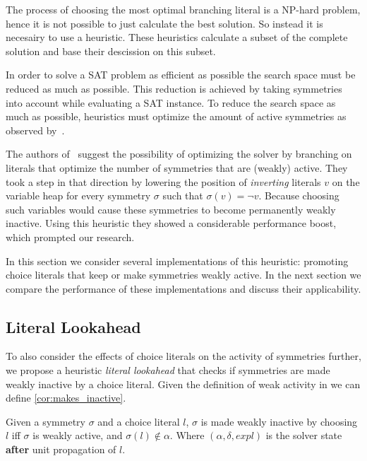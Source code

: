 
The process of choosing the most optimal branching literal is a NP-hard problem, hence it is not possible to 
just calculate the best solution. So instead it is necesairy to use a heuristic.
These heuristics calculate a subset of the complete solution and base their descission on this subset.

In order to solve a SAT problem as efficient as possible the search space must be reduced as much as possible.
This reduction is achieved by taking symmetries into account while evaluating a SAT instance.
To reduce the search space as much as possible, heuristics must optimize the amount of active symmetries as observed by~\cite{devriendt2012symmetry}.

The authors of~\cite{devriendt2012symmetry} suggest the possibility of optimizing the solver by
branching on literals that optimize the number of symmetries that are (weakly) active.
They took a step in that direction by lowering the position of \emph{inverting} literals $v$ on the variable heap for
every symmetry $\sigma$ such that $\sigma(v) = \neg v$.
Because choosing such variables would cause these symmetries to become permanently weakly inactive.
Using this heuristic they showed a considerable performance boost, which prompted our research.

In this section we consider several implementations of this heuristic: promoting choice literals
that keep or make symmetries weakly active.
In the next section we compare the performance of these implementations and discuss their
applicability.

\subsection{Literal Lookahead}
	To also consider the effects of choice literals on the activity of symmetries further,
	we propose a heuristic \emph{literal lookahead} that checks if symmetries are made weakly inactive by a choice literal.
	Given the definition of weak activity in \cite{devriendt2012symmetry} we can define \cref{cor:makes_inactive}.\\

	\begin{corollary}
		\label{cor:makes_inactive}
		Given a symmetry $\sigma$ and a choice literal $l$,
		$\sigma$ is made weakly inactive by choosing $l$ iff
		$\sigma$ is weakly active, and $\sigma(l) \notin \alpha$.
		Where $(\alpha,\delta,\textit{expl})$ is the solver state \textbf{after} unit propagation of $l$. 
	\end{corollary}

